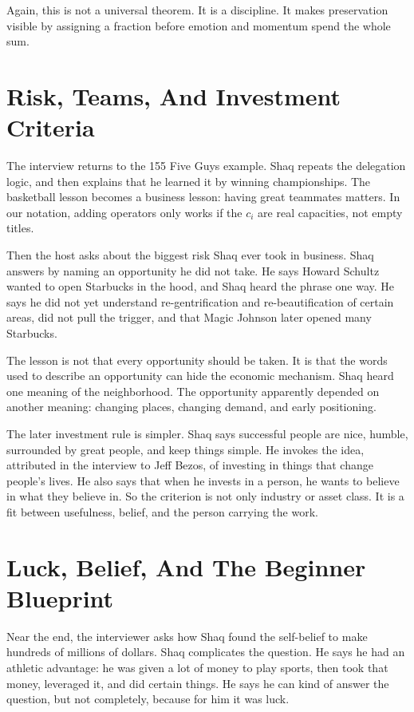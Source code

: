Again, this is not a universal theorem. It is a discipline. It makes preservation visible by assigning a fraction before emotion and momentum spend the whole sum.

\section{Risk, Teams, And Investment Criteria}

The interview returns to the 155 Five Guys example. Shaq repeats the delegation logic, and then explains that he learned it by winning championships. The basketball lesson becomes a business lesson: having great teammates matters. In our notation, adding operators only works if the \(c_i\) are real capacities, not empty titles.

Then the host asks about the biggest risk Shaq ever took in business. Shaq answers by naming an opportunity he did not take. He says Howard Schultz wanted to open Starbucks in the hood, and Shaq heard the phrase one way. He says he did not yet understand re-gentrification and re-beautification of certain areas, did not pull the trigger, and that Magic Johnson later opened many Starbucks.

The lesson is not that every opportunity should be taken. It is that the words used to describe an opportunity can hide the economic mechanism. Shaq heard one meaning of the neighborhood. The opportunity apparently depended on another meaning: changing places, changing demand, and early positioning.

The later investment rule is simpler. Shaq says successful people are nice, humble, surrounded by great people, and keep things simple. He invokes the idea, attributed in the interview to Jeff Bezos, of investing in things that change people's lives. He also says that when he invests in a person, he wants to believe in what they believe in. So the criterion is not only industry or asset class. It is a fit between usefulness, belief, and the person carrying the work.

\section{Luck, Belief, And The Beginner Blueprint}

Near the end, the interviewer asks how Shaq found the self-belief to make hundreds of millions of dollars. Shaq complicates the question. He says he had an athletic advantage: he was given a lot of money to play sports, then took that money, leveraged it, and did certain things. He says he can kind of answer the question, but not completely, because for him it was luck.

